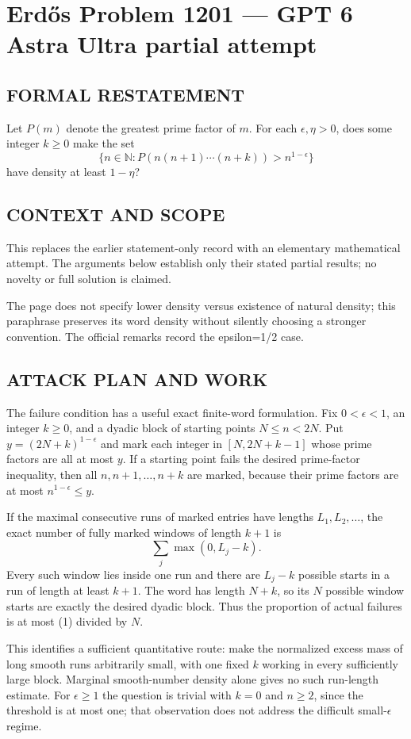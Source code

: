 \section*{Erd\H{o}s Problem 1201 --- GPT 6 Astra Ultra partial attempt}


\subsection*{FORMAL RESTATEMENT}
Let $P(m)$ denote the greatest prime factor of $m$. For each $\epsilon,\eta>0$, does some integer $k\geq0$ make the set
\[\{n\in\mathbb N:P(n(n+1)\cdots(n+k))>n^{1-\epsilon}\}\]
have density at least $1-\eta$?

\subsection*{CONTEXT AND SCOPE}
This replaces the earlier statement-only record with an elementary mathematical attempt. The arguments below establish only their stated partial results; no novelty or full solution is claimed.

The page does not specify lower density versus existence of natural density; this paraphrase preserves its word density without silently choosing a stronger convention. The official remarks record the epsilon=1/2 case.

\subsection*{ATTACK PLAN AND WORK}
The failure condition has a useful exact finite-word formulation. Fix
$0<\epsilon<1$, an integer $k\ge0$, and a dyadic block of starting points
$N\le n<2N$. Put $y=(2N+k)^{1-\epsilon}$ and mark each integer in
$[N,2N+k-1]$ whose prime factors are all at most $y$.
If a starting point fails the desired prime-factor inequality, then all
$n,n+1,\ldots,n+k$ are marked, because their prime factors are at most
$n^{1-\epsilon}\le y$.

If the maximal consecutive runs of marked entries have lengths $L_1,L_2,\ldots$,
the exact number of fully marked windows of length $k+1$ is
\[\sum_j\max(0,L_j-k).\tag{1}\]
Every such window lies inside one run and there are $L_j-k$ possible starts
in a run of length at least $k+1$. The word has length $N+k$, so its $N$
possible window starts are exactly the desired dyadic block.
Thus the proportion of actual failures is at most (1) divided by $N$.

This identifies a sufficient quantitative route: make the normalized excess
mass of long smooth runs arbitrarily small, with one fixed $k$ working in
every sufficiently large block. Marginal smooth-number density alone gives
no such run-length estimate. For $\epsilon\ge1$ the question is trivial with
$k=0$ and $n\ge2$, since the threshold is at most one; that observation does
not address the difficult small-$\epsilon$ regime.

